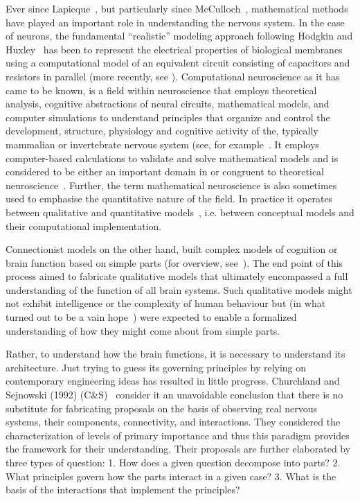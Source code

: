 \documentclass[10pt,letterpaper]{article}
\begin{document}
Ever since Lapicque~\cite{lapicque07}, but particularly since McCulloch~\cite{mcculloch43},
mathematical methods have played an important role in understanding the nervous system. In the case of neurons, the fundamental ``realistic'' modeling approach following Hodgkin and Huxley~\cite{hodgkin52e} has been to represent the electrical properties of biological membranes using a computational model of an equivalent circuit consisting of capacitors and resistors in parallel (more recently, see \cite{bedard13}). Computational neuroscience as it has came to be known, is a field within neuroscience that employs theoretical analysis, cognitive abstractions of neural circuits, mathematical models, and computer simulations to understand principles that organize and control the development, structure, physiology and cognitive activity of the, typically mammalian or invertebrate nervous system (see, for example~\cite{L:1992kl,ejn17,larson18}. It employs computer-based calculations to validate and solve mathematical models and is considered to be either an important domain in or congruent to theoretical neuroscience~\cite{trappenberg23}. Further, the term mathematical neuroscience is also sometimes used to emphasise the quantitative nature of the field. In practice it operates between qualitative and quantitative models~\cite{sandberg08}, i.e. between conceptual models and their computational implementation.

Connectionist models on the other hand, built complex models of cognition or brain function based on simple parts (for overview, see~\cite{berkeley19}).  The end point of this process aimed to fabricate qualitative models that ultimately encompassed a full understanding of the function of all brain systems.  Such qualitative models might not exhibit intelligence or the complexity of human behaviour but (in what turned out to be a vain hope~\cite{fodor88}) were expected to enable a formalized understanding of how they might come about from simple parts.

Rather, to understand how the brain functions, it is necessary to understand its architecture. Just trying to guess its governing principles by relying on contemporary engineering ideas has resulted in little progress. Churchland and Sejnowski (1992) (C\&S)~\cite{Churchland:1992uq} consider it an unavoidable conclusion that there is no substitute for fabricating proposals on the basis of observing real nervous systems, their components, connectivity, and interactions.  They considered the characterization of levels of primary importance and thus this paradigm provides the framework for their understanding.  Their proposals are further elaborated by three types of question: 1. How does a given question decompose into parts? 2. What principles govern how the parts interact in a given case? 3. What is the basis of the interactions that implement the principles?~\cite{Churchland:1992uq}
\end{document}
